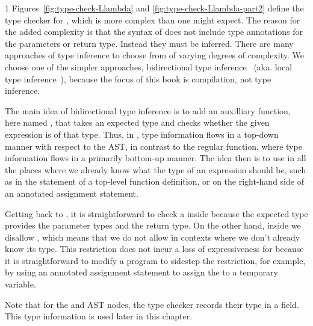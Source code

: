 \documentclass[7x10,nocrop]{TimesAPriori_MIT}%
\def\pythonEd{1}
\def\edition{0}
\begin{document}
{\if\edition\pythonEd
%
Figures~\ref{fig:type-check-Llambda} and
\ref{fig:type-check-Llambda-part2} define the type checker for
\LangLam{}, which is more complex than one might expect. The reason
for the added complexity is that the syntax of  does not
include type annotations for the parameters or return type.  Instead
they must be inferred. There are many approaches of type inference to
choose from of varying degrees of complexity. We choose one of the
simpler approaches, bidirectional type inference~\citep{Dunfield:2021}
(aka. local type inference~\citep{Pierce:2000}), because the focus of
this book is compilation, not type inference.

The main idea of bidirectional type inference is to add an auxilliary
function, here named , that takes an expected type
and checks whether the given expression is of that type.  Thus, in
, type information flows in a top-down manner with
respect to the AST, in contrast to the regular 
function, where type information flows in a primarily bottom-up
manner.
%
The idea then is to use  in all the places where we
already know what the type of an expression should be, such as in the
 statement of a top-level function definition, or on the
right-hand side of an annotated assignment statement.

Getting back to , it is straightforward to check a
 inside  because the expected type
provides the parameter types and the return type.  On the other hand,
inside  we disallow , which means
that we do not allow  in contexts where we don't already
know its type. This restriction does not incur a loss of
expressiveness for \LangLam{} because it is straightforward to modify
a program to sidestep the restriction, for example, by using an
annotated assignment statement to assign the  to a
temporary variable.

Note that for the  and  AST nodes, the type
checker records their type in a  field. This type
information is used later in this chapter.
%
\fi}
\end{document}
